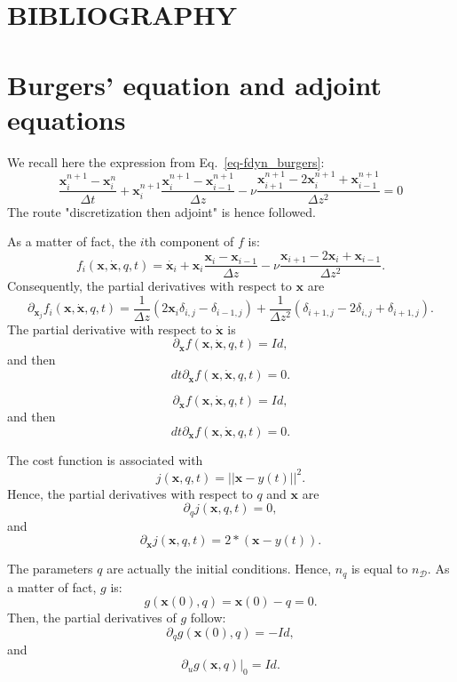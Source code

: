 \documentclass[aip,pof,nofootinbib,reprint,onecolumn]{revtex4-1}
\newcommand{\gras}[1]{\boldsymbol{#1}}
\newcommand{\mypar}[1]{\left(#1\right)}
\newcommand{\Nphaz}{n_{\mathcal{D}}} %
\newcommand{\fdyn}{f} %
\newcommand{\costff}{j} %
\newcommand{\obs}{y} %
\newcommand{\point}{\gras{x}} %
\begin{document}
\section*{BIBLIOGRAPHY}


\appendix
\section{Burgers' equation and adjoint equations}
\label{an-burgers}
We recall here the expression from Eq.~\eqref{eq-fdyn_burgers}:
$$ \frac{\point^{n+1}_i - \point^{n}_i}{\Delta t} + \point^{n+1}_i \frac{\point^{n+1}_i - \point^{n+1}_{i-1}}{\Delta z} - \nu \frac{\point^{n+1}_{i+1} -2 \point^{n+1}_i + \point^{n+1}_{i-1}}{\Delta z ^2} = 0 $$
The route "discretization then adjoint" is hence followed.

As a matter of fact, the $i$th component of $\fdyn$ is:
$$\fdyn_i\mypar{\point,\dot{\point},q,t} = \dot{\point_i} + \point_i \frac{\point_i - \point_{i-1}}{\Delta z} - \nu \frac{\point_{i+1} -2 \point_i + \point_{i-1}}{\Delta z ^2}. $$
Consequently, the partial derivatives with respect to $\point$ are
$$\partial_{\point_j} \fdyn_i\mypar{\point,\dot{\point},q,t} = \frac{1}{\Delta z }\mypar{2 \point_i \delta_{i,j} - \delta_{i-1,j}} + \frac{1}{\Delta z ^2}\mypar{\delta_{i+1,j} - 2 \delta_{i,j} + \delta_{i+1,j}}.$$
The partial derivative with respect to $\dot{\point}$ is
$$\partial_{\dot{\point}} \fdyn\mypar{\point,\dot{\point},q,t}  = Id,$$
and then $$dt\partial_{\dot{\point}} \fdyn\mypar{\point,\dot{\point},q,t}  = 0. $$

$$\partial_{\dot{\point}} \fdyn\mypar{\point,\dot{\point},q,t}  = Id,$$
and then $$dt\partial_{\dot{\point}} \fdyn\mypar{\point,\dot{\point},q,t}  = 0. $$

The cost function is associated with
$$\costff\mypar{\point,q,t} = || \point-\obs(t)||^2.$$
Hence, the partial derivatives with respect to $q$ and $\point$ are
$$\partial_q \costff\mypar{\point,q,t} = 0,$$
and
$$\partial_{\point} \costff\mypar{\point,q,t} = 2*\mypar{\point-\obs(t)}.$$

The parameters $q$ are actually the initial conditions. Hence, $n_q$ is equal to $\Nphaz$. As a matter of fact, $g$ is:
$$g(\point(0),q) = \point(0)-q = 0.$$
Then, the partial derivatives of $g$ follow:
$$\partial_q g(\point(0),q) = -Id,$$
and
$$\partial_u g(\point,q)|_0 = Id.$$
\end{document}
